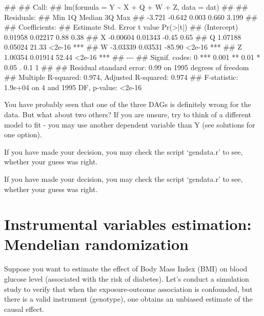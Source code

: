 \documentclass[
]{book}
\newenvironment{Shaded}{\begin{snugshade}}{\end{snugshade}}
\newcommand{\NormalTok}[1]{#1}
\begin{document}
\begin{Shaded}
\begin{Highlighting}[]
\NormalTok{\#\# }
\NormalTok{\#\# Call:}
\NormalTok{\#\# lm(formula = Y \textasciitilde{} X + Q + W + Z, data = dat)}
\NormalTok{\#\# }
\NormalTok{\#\# Residuals:}
\NormalTok{\#\#    Min     1Q Median     3Q    Max }
\NormalTok{\#\# {-}3.721 {-}0.642  0.003  0.660  3.199 }
\NormalTok{\#\# }
\NormalTok{\#\# Coefficients:}
\NormalTok{\#\#             Estimate Std. Error t value Pr(\textgreater{}|t|)    }
\NormalTok{\#\# (Intercept)  0.01958    0.02217    0.88     0.38    }
\NormalTok{\#\# X           {-}0.00604    0.01343   {-}0.45     0.65    }
\NormalTok{\#\# Q            1.07188    0.05024   21.33   \textless{}2e{-}16 ***}
\NormalTok{\#\# W           {-}3.03339    0.03531  {-}85.90   \textless{}2e{-}16 ***}
\NormalTok{\#\# Z            1.00354    0.01914   52.44   \textless{}2e{-}16 ***}
\NormalTok{\#\# {-}{-}{-}}
\NormalTok{\#\# Signif. codes:  0 \textquotesingle{}***\textquotesingle{} 0.001 \textquotesingle{}**\textquotesingle{} 0.01 \textquotesingle{}*\textquotesingle{} 0.05 \textquotesingle{}.\textquotesingle{} 0.1 \textquotesingle{} \textquotesingle{} 1}
\NormalTok{\#\# }
\NormalTok{\#\# Residual standard error: 0.99 on 1995 degrees of freedom}
\NormalTok{\#\# Multiple R{-}squared:  0.974,  Adjusted R{-}squared:  0.974 }
\NormalTok{\#\# F{-}statistic: 1.9e+04 on 4 and 1995 DF,  p{-}value: \textless{}2e{-}16}
\end{Highlighting}
\end{Shaded}

You have probably seen that one of the three DAGs is definitely wrong for the data. But what about two others? If you are unsure, try to think of a different model to fit - you may use another dependent variable than Y (see solutions for one option).

If you have made your decision, you may check the script `gendata.r' to see, whether your guess was right.

If you have made your decision, you may check the script `gendata.r' to see, whether your guess was right.

\section{Instrumental variables estimation: Mendelian randomization}\label{instrumental-variables-estimation-mendelian-randomization}

Suppose you want to estimate the effect of Body Mass Index (BMI) on blood glucose level (associated with the risk of diabetes). Let's conduct a simulation study to verify that when the exposure-outcome association is confounded, but there is a valid instrument (genotype), one obtains an unbiased estimate of the causal effect.
\end{document}
